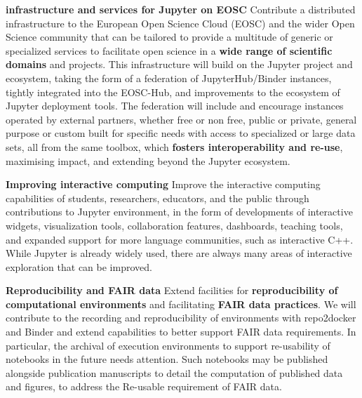 \begin{compactenum}

\item \label{obj:deployment}
  \textbf{infrastructure and services for Jupyter on EOSC}
  Contribute a distributed infrastructure to the European Open Science Cloud
  (EOSC) and the wider Open Science community that can be tailored to
  provide a multitude of generic or specialized services to facilitate
  open science in a \textbf{wide range of scientific domains} and projects.
  This infrastructure will build on the Jupyter project and ecosystem,
  taking the form of a federation of JupyterHub/Binder instances,
  tightly integrated into the EOSC-Hub,
  and improvements to the ecosystem of Jupyter deployment tools.
  The federation will include and encourage instances operated by
  external partners, whether free or non free, public or private,
  general purpose or custom built for specific needs
  with access to specialized or large data sets,
  all from the same toolbox,
  which \textbf{fosters interoperability and re-use},
  maximising impact,
  and extending beyond the Jupyter ecosystem.

\item \label{obj:interactivity}
  \textbf{Improving interactive computing}
  Improve the interactive computing capabilities of
  students, researchers, educators, and the public
  through contributions to Jupyter environment,
  in the form of developments of interactive widgets,
  visualization tools, collaboration features, dashboards,
  teaching tools,
  and expanded support for more language communities,
  such as interactive C++.
  While Jupyter is already widely used,
  there are always many areas
  of interactive exploration that can be improved.

\item \label{obj:reusability}
  \textbf{Reproducibility and FAIR data}
  Extend facilities for
  \textbf{reproducibility of computational environments}
  and facilitating \textbf{FAIR data practices}.
  We will contribute to the recording and reproducibility
  of environments with repo2docker and Binder
  and extend capabilities to better support FAIR
  data requirements. In particular, the archival of execution
  environments to support re-usability of notebooks in the future
  needs attention. Such notebooks may be published alongside
  publication manuscripts to detail the computation of published data
  and figures, to address the Re-usable requirement of FAIR data.


\end{compactenum}
